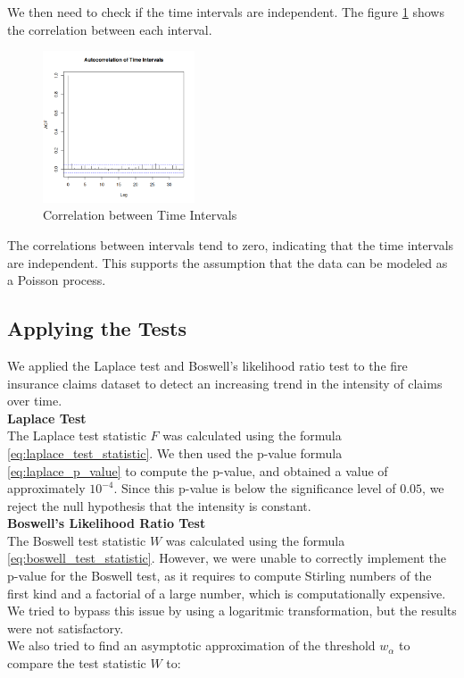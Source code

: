 \documentclass{journalstyle}
\begin{document}
We then need to check if the time intervals are independent.
The figure \ref{fig:correlation_intervals} shows the correlation between each interval.

\begin{figure}[H]
    \centering
    \includegraphics[width=0.4\textwidth]{src/correlation_intervals.png}
    \caption{Correlation between Time Intervals}
    \label{fig:correlation_intervals}
\end{figure}

The correlations between intervals tend to zero, indicating that the time intervals are independent.
This supports the assumption that the data can be modeled as a Poisson process.


\subsection{Applying the Tests}
We applied the Laplace test and Boswell's likelihood ratio test to the fire insurance claims dataset to detect an increasing trend in the intensity of claims over time. \\

\noindent\textbf{Laplace Test} \\
The Laplace test statistic $F$ was calculated using the formula \eqref{eq:laplace_test_statistic}.
We then used the p-value formula \eqref{eq:laplace_p_value} to compute the p-value, and obtained a value of approximately $10^{-4}$.
Since this p-value is below the significance level of $0.05$, we reject the null hypothesis that the intensity is constant. \\

\noindent\textbf{Boswell's Likelihood Ratio Test} \\
The Boswell test statistic $W$ was calculated using the formula \eqref{eq:boswell_test_statistic}.
However, we were unable to correctly implement the p-value for the Boswell test, as it requires to compute Stirling numbers of the first kind and a factorial of a large number, which is computationally expensive.
We tried to bypass this issue by using a logaritmic transformation, but the results were not satisfactory. \\
We also tried to find an asymptotic approximation of the threshold $w_{\alpha}$ to compare the test statistic $W$ to: \\
\end{document}
